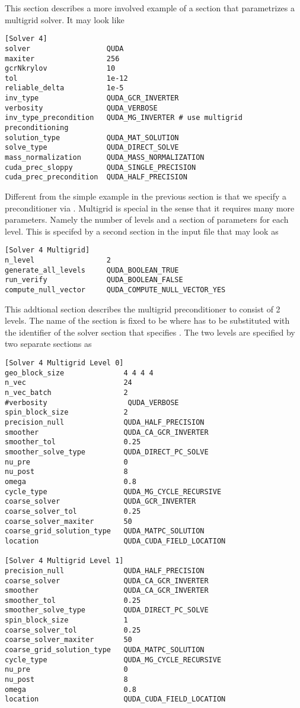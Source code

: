 This section describes a more involved example of a section that parametrizes a multigrid solver. It may look like
\begin{verbatim}
[Solver 4]
solver                  QUDA
maxiter                 256
gcrNkrylov              10
tol                     1e-12
reliable_delta          1e-5
inv_type                QUDA_GCR_INVERTER
verbosity               QUDA_VERBOSE
inv_type_precondition   QUDA_MG_INVERTER # use multigrid preconditioning
solution_type           QUDA_MAT_SOLUTION
solve_type              QUDA_DIRECT_SOLVE
mass_normalization      QUDA_MASS_NORMALIZATION
cuda_prec_sloppy        QUDA_SINGLE_PRECISION
cuda_prec_precondition  QUDA_HALF_PRECISION
\end{verbatim}
Different from the simple example in the previous section is that we specify a preconditioner via . Multigrid is special in the sense that it requires many more parameters. Namely the number of levels and a section of parameters for each level. This is specifed by a second section in the input file that may look as
\begin{verbatim}
[Solver 4 Multigrid]
n_level                 2
generate_all_levels     QUDA_BOOLEAN_TRUE
run_verify              QUDA_BOOLEAN_FALSE
compute_null_vector     QUDA_COMPUTE_NULL_VECTOR_YES
\end{verbatim}
This addtional section describes the multigrid preconditioner to consist of 2 levels. The name of the section is fixed to be  where  has to be substituted with the identifier of the solver section that specifies . The two levels are specified by two separate sections as
\begin{verbatim}
[Solver 4 Multigrid Level 0]
geo_block_size              4 4 4 4
n_vec                       24
n_vec_batch                 2
#verbosity                   QUDA_VERBOSE
spin_block_size             2
precision_null              QUDA_HALF_PRECISION
smoother                    QUDA_CA_GCR_INVERTER
smoother_tol                0.25
smoother_solve_type         QUDA_DIRECT_PC_SOLVE
nu_pre                      0
nu_post                     8
omega                       0.8
cycle_type                  QUDA_MG_CYCLE_RECURSIVE
coarse_solver               QUDA_GCR_INVERTER
coarse_solver_tol           0.25
coarse_solver_maxiter       50
coarse_grid_solution_type   QUDA_MATPC_SOLUTION
location                    QUDA_CUDA_FIELD_LOCATION

[Solver 4 Multigrid Level 1]
precision_null              QUDA_HALF_PRECISION
coarse_solver               QUDA_CA_GCR_INVERTER
smoother                    QUDA_CA_GCR_INVERTER
smoother_tol                0.25
smoother_solve_type         QUDA_DIRECT_PC_SOLVE
spin_block_size             1
coarse_solver_tol           0.25
coarse_solver_maxiter       50
coarse_grid_solution_type   QUDA_MATPC_SOLUTION
cycle_type                  QUDA_MG_CYCLE_RECURSIVE
nu_pre                      0
nu_post                     8
omega                       0.8
location                    QUDA_CUDA_FIELD_LOCATION
\end{verbatim}
